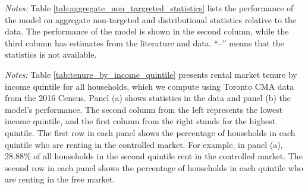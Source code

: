 \documentclass[parskip=full]{article}
\newenvironment{fignote2}[1]
{
\par
\medskip
\begin{minipage}{#1}
\footnotesize
}
{
\end{minipage}
}
\begin{document}
\begin{table}[H]
    \centering
    \caption{Aggregate non-targeted statistics}
    \vspace{-0.5cm}
    \label{tab:aggregate_non_targreted_statistics}  
    \vspace{-0.45cm}
    \begin{fignote2}{0.9\textwidth}
      \textit{Notes:} Table \ref{tab:aggregate_non_targreted_statistics} lists the performance of the model on aggregate non-targeted and distributional statistics relative to the data. The performance of the model is shown in the second column, while the third column has estimates from the literature and data. ``--'' means that the statistics is not available. 
    \end{fignote2}
\end{table}

\begin{table}[H]
    \centering
    \caption{Rental market by income quintile for all households in benchmark}
    \vspace{-0.5cm}
    \label{tab:tenure_by_income_quintile}    
    
    \vspace{-0.45cm}
    \begin{fignote2}{0.66\textwidth}
      \textit{Notes:} Table \ref{tab:tenure_by_income_quintile} presents rental market tenure by income quintile for all households, which we compute using Toronto CMA data from the 2016 Census. Panel (a) shows statistics in the data and panel (b) the model's performance. The second column from the left represents the lowest income quintile, and the first column from the right stands for the highest quintile. The first row in each panel shows the percentage of households in each quintile who are renting in the controlled market. For example, in panel (a), 28.88\% of all households in the second quintile rent in the controlled market. The second row in each panel shows the percentage of households in each quintile who are renting in the free market. 
    \end{fignote2}
\end{table}

\end{document}
